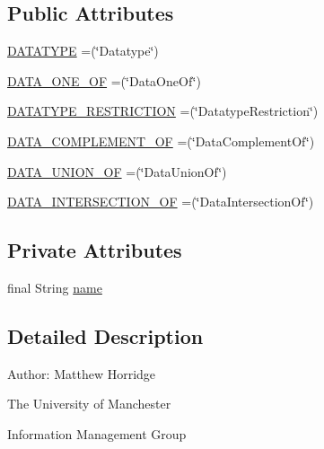\subsection*{Public Attributes}
\begin{DoxyCompactItemize}
\item 
\hyperlink{enumorg_1_1semanticweb_1_1owlapi_1_1model_1_1_data_range_type_a850fc31c640c6beb9f46082527c189c3}{D\-A\-T\-A\-T\-Y\-P\-E} =(\char`\"{}Datatype\char`\"{})
\item 
\hyperlink{enumorg_1_1semanticweb_1_1owlapi_1_1model_1_1_data_range_type_ac5969e0951ba9051a38fe79058edd9aa}{D\-A\-T\-A\-\_\-\-O\-N\-E\-\_\-\-O\-F} =(\char`\"{}Data\-One\-Of\char`\"{})
\item 
\hyperlink{enumorg_1_1semanticweb_1_1owlapi_1_1model_1_1_data_range_type_aa9614034d148b7d08277642c01bcefc5}{D\-A\-T\-A\-T\-Y\-P\-E\-\_\-\-R\-E\-S\-T\-R\-I\-C\-T\-I\-O\-N} =(\char`\"{}Datatype\-Restriction\char`\"{})
\item 
\hyperlink{enumorg_1_1semanticweb_1_1owlapi_1_1model_1_1_data_range_type_a5fd74326711fd8252afbc4c43c099292}{D\-A\-T\-A\-\_\-\-C\-O\-M\-P\-L\-E\-M\-E\-N\-T\-\_\-\-O\-F} =(\char`\"{}Data\-Complement\-Of\char`\"{})
\item 
\hyperlink{enumorg_1_1semanticweb_1_1owlapi_1_1model_1_1_data_range_type_afa28387e0431b51af2963c0c4506d0f7}{D\-A\-T\-A\-\_\-\-U\-N\-I\-O\-N\-\_\-\-O\-F} =(\char`\"{}Data\-Union\-Of\char`\"{})
\item 
\hyperlink{enumorg_1_1semanticweb_1_1owlapi_1_1model_1_1_data_range_type_aa8fea6878f34690e7729f3c1eb187834}{D\-A\-T\-A\-\_\-\-I\-N\-T\-E\-R\-S\-E\-C\-T\-I\-O\-N\-\_\-\-O\-F} =(\char`\"{}Data\-Intersection\-Of\char`\"{})
\end{DoxyCompactItemize}
\subsection*{Private Attributes}
\begin{DoxyCompactItemize}
\item 
final String \hyperlink{enumorg_1_1semanticweb_1_1owlapi_1_1model_1_1_data_range_type_a517a0801c2111a656af0b526996d36b4}{name}
\end{DoxyCompactItemize}


\subsection{Detailed Description}
Author\-: Matthew Horridge\par
 The University of Manchester\par
 Information Management Group

